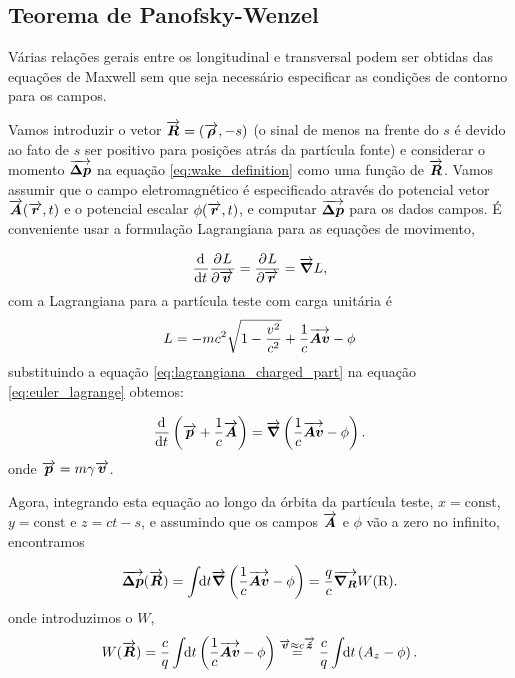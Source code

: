 \documentclass[
	12pt,				%
	openright,			%
	oneside,			%
	a4paper,		%
	chapter=TITLE,		%
	section=TITLE,		%
    brazil,				%
	english,			%
	sumario=tradicional,
	]{abntex2}
\begin{document}
\subsection{Teorema de Panofsky-Wenzel}

Várias relações gerais entre os  longitudinal e transversal podem ser obtidas das equações de Maxwell sem que seja necessário especificar as condições de contorno para os campos.

Vamos introduzir o vetor $\overrightarrow{\boldsymbol{R}} =(\overrightarrow{\boldsymbol{\rho}},-s)$ (o sinal de menos na frente do $s$ é devido ao fato de $s$ ser positivo para posições atrás da partícula fonte) e considerar o momento $\overrightarrow{\boldsymbol{\Delta p}}$ na equação \ref{eq:wake_definition} como uma função de $\overrightarrow{\boldsymbol{R}}$. Vamos assumir que o campo eletromagnético é especificado através do potencial vetor $\overrightarrow{\boldsymbol{A}}(\overrightarrow{\boldsymbol{r}},t)$ e o potencial escalar $\phi(\overrightarrow{\boldsymbol{r}},t)$, e computar
$\overrightarrow{\boldsymbol{\Delta p}}$ para os dados campos. É conveniente usar a formulação Lagrangiana para as equações de movimento,

\begin{equation}\label{eq:euler_lagrange}
    \frac{\mathrm{d}^{{}}}{\mathrm{d} t^{{}}}\frac{\partial^{{}}L}{\partial \overrightarrow{\boldsymbol{v}}^{{}}} = \frac{\partial^{{}}L}{\partial \overrightarrow{\boldsymbol{r}}^{{}}} = \overrightarrow{\boldsymbol{\nabla}}L,
\end{equation}
com a Lagrangiana para a partícula teste com carga unitária é
\begin{equation}\label{eq:lagrangiana_charged_part}
   L = -mc^2 \sqrt{1 - \frac{v^2}{c^2}} + \frac1c \overrightarrow{\boldsymbol{Av}} - \phi
\end{equation}
substituindo a equação \ref{eq:lagrangiana_charged_part} na equação \ref{eq:euler_lagrange} obtemos:

\begin{equation}
 \frac{\mathrm{d}^{{}}}{\mathrm{d} t^{{}}} \left(\overrightarrow{\boldsymbol{p}} + \frac1c \overrightarrow{\boldsymbol{A}}\right) = \overrightarrow{\boldsymbol{\nabla}}\left(\frac1c \overrightarrow{\boldsymbol{Av}} - \phi\right).
\end{equation}
onde $\overrightarrow{\boldsymbol{p}} = m\gamma\overrightarrow{\boldsymbol{v}}$.

Agora, integrando esta equação ao longo da órbita da partícula teste, $x=\mathrm{const}$, $y=\mathrm{const}$ e $z = ct-s$, e assumindo que os campos $\overrightarrow{\boldsymbol{A}}$ e $\phi$ vão a zero no infinito, encontramos

\begin{equation}
 \overrightarrow{\boldsymbol{\Delta p}}(\overrightarrow{\boldsymbol{R}}) = \int\!\!\text{d}t \overrightarrow{\boldsymbol{\nabla}}\left(\frac1c\overrightarrow{\boldsymbol{Av}} - \phi \right) = \frac{q}{c} \overrightarrow{\boldsymbol{\nabla_R}}W(\mathrm{R}).
\end{equation}
onde introduzimos o  $W$,
\begin{equation}
 W(\overrightarrow{\boldsymbol{R}}) = \frac{c}{q}\int\!\!\text{d}t \left(\frac1c \overrightarrow{\boldsymbol{Av}} -\phi\right)
      \overset{\overrightarrow{\boldsymbol{v}} \approx c\overrightarrow{\boldsymbol{\hat{z}}}}{=}
                 \frac{c}{q}\int\!\!\text{d}t \left(A_z -\phi\right).
\end{equation}
\end{document}
